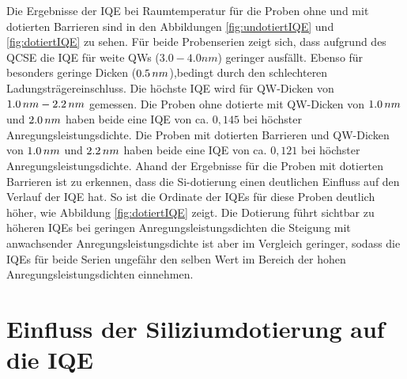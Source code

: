 \noindent 
Die Ergebnisse der IQE bei Raumtemperatur für die Proben ohne und mit dotierten Barrieren sind in den Abbildungen 
\ref{fig:undotiertIQE} und \ref{fig:dotiertIQE} zu sehen. Für beide Probenserien zeigt sich, dass aufgrund des QCSE die IQE für weite QWs 
($3.0 -4.0  nm$) geringer ausfällt. Ebenso für besonders geringe Dicken ($0.5\thinspace nm$),bedingt durch den schlechteren Ladungsträgereinschluss. Die höchste IQE wird für QW-Dicken von $1.0 \thinspace nm- 2.2 \thinspace nm$ gemessen. Die Proben ohne dotierte mit QW-Dicken von $1.0 \thinspace nm$ und $2.0\thinspace nm$ haben beide eine IQE von ca. $0,145$ bei höchster Anregungsleistungsdichte.
\newline
Die Proben mit dotierten Barrieren und QW-Dicken von $1.0 \thinspace nm$ und $2.2\thinspace nm$ haben beide eine IQE von ca. $0,121$ bei höchster Anregungsleistungsdichte. 
\newline
Ahand der Ergebnisse für die Proben mit dotierten Barrieren ist zu erkennen, dass die Si-dotierung einen deutlichen Einfluss auf den Verlauf der IQE hat. So ist die Ordinate der IQEs für diese Proben deutlich höher, wie Abbildung \ref{fig:dotiertIQE} zeigt. Die Dotierung führt sichtbar zu höheren IQEs bei geringen Anregungsleistungsdichten die Steigung mit anwachsender Anregungsleistungsdichte ist aber im Vergleich geringer, sodass die IQEs für beide Serien ungefähr den selben Wert im Bereich der hohen Anregungsleistungsdichten einnehmen. 


\section{Einfluss der Siliziumdotierung auf die IQE}

